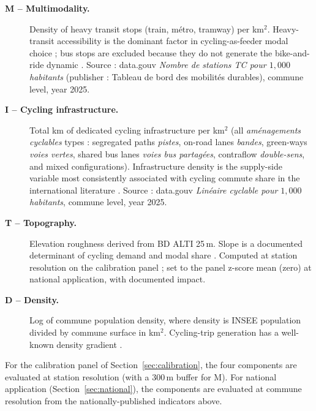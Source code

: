 \documentclass[11pt,a4paper]{article}
\begin{document}
\begin{description}
    \item[\textbf{M -- Multimodality.}]  Density of heavy transit
          stops (train, m\'etro, tramway) per km$^2$.  Heavy-transit
          accessibility is the dominant factor in cycling-as-feeder
          modal choice ; bus stops are excluded because they do
          not generate the bike-and-ride dynamic
          \citep{Martens2007,Saberi2018}.
          Source : data.gouv \emph{Nombre de stations TC pour
          $1{,}000$ habitants} (publisher : Tableau de bord des
          mobilit\'es durables), commune level, year 2025.

    \item[\textbf{I -- Cycling infrastructure.}]  Total km of
          dedicated cycling infrastructure per km$^2$ (all
          \emph{am\'enagements cyclables} types : segregated paths
          \emph{pistes}, on-road lanes \emph{bandes}, green-ways
          \emph{voies vertes}, shared bus lanes \emph{voies bus
          partag\'ees}, contraflow \emph{double-sens}, and mixed
          configurations).
          Infrastructure density is the supply-side variable most
          consistently associated with cycling commute share in the
          international literature
          \citep{Schoner2014,Parkin2008,Heinen2010}.
          Source : data.gouv \emph{Lin\'eaire cyclable pour
          $1{,}000$ habitants}, commune level, year 2025.

    \item[\textbf{T -- Topography.}]  Elevation roughness derived
          from BD ALTI 25\,m.  Slope is a documented determinant of
          cycling demand and modal share
          \citep{Parkin2008,Rietveld2004}.
          Computed at station resolution on the calibration
          panel ; set to the panel z-score mean (zero) at national
          application, with documented impact.

    \item[\textbf{D -- Density.}]  Log of commune population density,
          where density is INSEE population divided by commune
          surface in km$^2$.  Cycling-trip generation has a well-known
          density gradient \citep{FaghihImani2014,Rietveld2004}.
\end{description}

For the calibration panel of Section~\ref{sec:calibration}, the four
components are evaluated at station resolution (with a 300\,m buffer
for M).  For national application (Section~\ref{sec:national}), the
components are evaluated at commune resolution from the
nationally-published indicators above.
\end{document}
